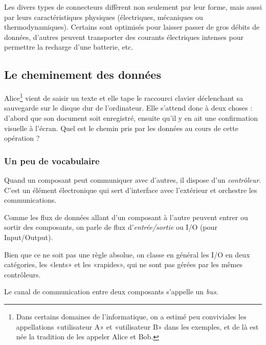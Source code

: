 Les divers types de connecteurs diffèrent non seulement par leur forme, mais aussi par leurs caractéristiques physiques (électriques, mécaniques ou thermodynamiques). Certains sont optimisés pour laisser passer de gros débits de données, d'autres peuvent transporter des courants électriques intenses pour permettre la recharge d'une batterie, etc.
\subsection{Le cheminement des données}
Alice\footnote{Dans certains domaines de l'informatique, on a estimé peu conviviales les appellations «utilisateur A» et «utilisateur B» dans les exemples, et de là est née la tradition de les appeler Alice et Bob.} vient de saisir un texte et elle tape le raccourci clavier déclenchant sa sauvegarde sur le disque dur de l'ordinateur. Elle s'attend donc à deux choses : d'abord que son document soit enregistré, ensuite qu'il y en ait une confirmation visuelle à l'écran. Quel est le chemin pris par les données au cours de cette opération ?
\subsubsection{Un peu de vocabulaire}
Quand un composant peut communiquer avec d'autres, il dispose d'un \emph{contrôleur}. C'est un élément électronique qui sert d'interface avec l'extérieur et orchestre les communications.

Comme les flux de données allant d'un composant à l'autre peuvent entrer ou sortir des composants, on parle de flux d'\emph{entrée/sortie} ou I/O (pour Input/Output).

Bien que ce ne soit pas une règle absolue, on classe en général les I/O en deux catégories, les «lents» et les «rapides», qui ne sont pas gérées par les mêmes contrôleurs.

Le canal de communication entre deux composants s'appelle un \emph{bus}.
